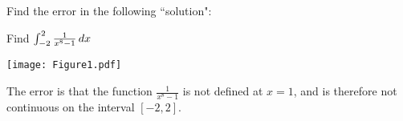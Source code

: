 \documentclass[nooutcomes]{ximera}
\begin{document}
\newpage



\begin{problem}
Find the error in the following ``solution":

Find $\int_{-2}^2 \frac{1}{x^8 - 1} \,d x$

	\begin{image}
	\texttt{[image: Figure1.pdf]}
	\end{image}

	\begin{freeResponse}
	The error is that the function $\frac{1}{x^8-1}$ is not defined at $x=1$, and is therefore not continuous on the interval $[-2,2]$.
	\end{freeResponse}

\end{problem}








	
	
	
	
	
	
	
	
	

	










								
				
				
	
\end{document}

